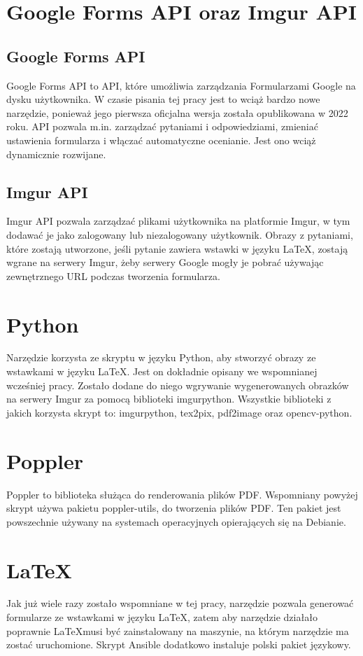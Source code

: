 \section{Google Forms API oraz Imgur API}

\subsection*{Google Forms API}
Google Forms API to API, które umożliwia zarządzania Formularzami Google na dysku
użytkownika. W czasie pisania tej pracy jest to wciąż bardzo nowe narzędzie, ponieważ
jego pierwsza oficjalna wersja została opublikowana w 2022 roku. API pozwala m.in. zarządzać
pytaniami i odpowiedziami, zmieniać ustawienia formularza i włączać automatyczne ocenianie.
Jest ono wciąż dynamicznie rozwijane.

\subsection*{Imgur API}
Imgur API pozwala zarządzać plikami użytkownika na platformie Imgur, w tym dodawać je jako
zalogowany lub niezalogowany użytkownik. Obrazy z pytaniami, które zostają utworzone, jeśli
pytanie zawiera wstawki w języku \LaTeX, zostają wgrane na serwery Imgur, żeby serwery Google
mogły je pobrać używając zewnętrznego URL podczas tworzenia formularza.

\section{Python}
Narzędzie korzysta ze skryptu w języku Python, aby stworzyć obrazy ze wstawkami w języku \LaTeX.
Jest on dokładnie opisany we wspomnianej wcześniej pracy. Zostało dodane do niego wgrywanie 
wygenerowanych obrazków na serwery Imgur za pomocą biblioteki imgurpython.
Wszystkie biblioteki z jakich korzysta skrypt to: imgurpython, tex2pix, pdf2image oraz
opencv-python.

\section{Poppler}
Poppler to biblioteka służąca do renderowania plików PDF. Wspomniany powyżej skrypt
używa pakietu poppler-utils, do tworzenia plików PDF. Ten pakiet jest powszechnie
używany na systemach operacyjnych opierających się na Debianie.

\section{LaTeX}
Jak już wiele razy zostało wspomniane w tej pracy, narzędzie pozwala generować formularze ze 
wstawkami
w języku \LaTeX, zatem aby narzędzie działało poprawnie \LaTeX musi być zainstalowany 
na maszynie, na którym narzędzie ma zostać uruchomione. Skrypt Ansible dodatkowo instaluje
polski pakiet językowy.
